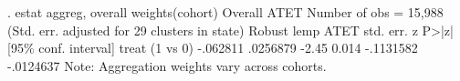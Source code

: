 . estat aggreg, overall weights(cohort)
{\smallskip}
Overall ATET                                            Number of obs = 15,988
{\smallskip}
                                 (Std. err. adjusted for 29 clusters in state)
             {\VBAR}               Robust
        lemp {\VBAR}       ATET   std. err.      z    P>|z|     [95\% conf. interval]
       treat {\VBAR}
   (1 vs 0)  {\VBAR}   -.062811   .0256879    -2.45   0.014    -.1131582   -.0124637
Note: Aggregation weights vary across cohorts.
